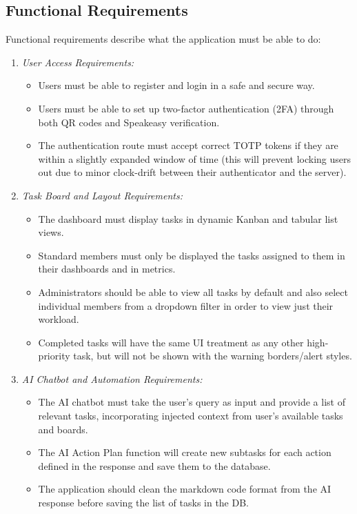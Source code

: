 \documentclass[conference]{IEEEtran}
\begin{document}
\subsection{Functional Requirements}
Functional requirements describe what the application must be able to do:
\begin{enumerate}
    \item \textit{User Access Requirements:}
    \begin{itemize}
        \item Users must be able to register and login in a safe and secure way.
        \item Users must be able to set up two-factor authentication (2FA) through both QR codes and Speakeasy verification.
        \item The authentication route must accept correct TOTP tokens if they are within a slightly expanded window of time (this will prevent locking users out due to minor clock-drift between their authenticator and the server).
    \end{itemize}
    \item \textit{Task Board and Layout Requirements:}
    \begin{itemize}
        \item The dashboard must display tasks in dynamic Kanban and tabular list views.
        \item Standard members must only be displayed the tasks assigned to them in their dashboards and in metrics.
        \item Administrators should be able to view all tasks by default and also select individual members from a dropdown filter in order to view just their workload.
        \item Completed tasks will have the same UI treatment as any other high-priority task, but will not be shown with the warning borders/alert styles.
    \end{itemize}
    \item \textit{AI Chatbot and Automation Requirements:}
    \begin{itemize}
        \item The AI chatbot must take the user's query as input and provide a list of relevant tasks, incorporating injected context from user's available tasks and boards.
        \item The AI Action Plan function will create new subtasks for each action defined in the response and save them to the database.
        \item The application should clean the markdown code format from the AI response before saving the list of tasks in the DB.

\end{itemize}
\end{enumerate}
\end{document}
